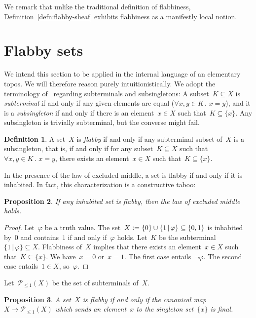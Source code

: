\documentclass[oneside]{amsart}
\theoremstyle{definition}
\newtheorem{defn}{Definition}[section]
\theoremstyle{plain}
\newtheorem{prop}[defn]{Proposition}
\theoremstyle{remark}
\renewcommand{\P}{\mathcal{P}}
\newcommand{\defeq}{\vcentcolon=}
\renewcommand{\_}{\mathpunct{.}\,}
\begin{document}
We remark that unlike the traditional definition of flabbiness,
Definition~\ref{defn:flabby-sheaf} exhibits flabbiness as a manifestly local
notion.


\section{Flabby sets}

We intend this section to be applied in the internal language of an elementary
topos. We will therefore reason purely intuitionistically. We
adopt the terminology of~\cite{kock:partial-maps} regarding subterminals and
subsingletons: A subset~$K \subseteq X$ is \emph{subterminal} if and only if any given
elements are equal ($\forall x,y \in K\_ x = y$), and it is a
\emph{subsingleton} if and only if there is an element~$x \in X$ such that~$K
\subseteq \{ x \}$. Any subsingleton is trivially subterminal, but the converse
might fail.

\begin{defn}A set~$X$ is \emph{flabby} if and only if any subterminal subset
of~$X$ is a subsingleton, that is, if and only if for any subset~$K \subseteq
X$ such that~$\forall x,y \in K\_ x = y$, there exists an element~$x \in X$
such that~$K \subseteq \{ x \}$.
\end{defn}

In the presence of the law of excluded middle, a set is flabby if and only if
it is inhabited. In fact, this characterization is a constructive taboo:

\begin{prop}If any inhabited set is flabby, then the law of excluded middle
holds.
\end{prop}

\begin{proof}Let~$\varphi$ be a truth value. The set~$X \defeq \{ 0 \}
\cup \{ 1 \,|\, \varphi \} \subseteq \{ 0,1 \}$ is inhabited by~$0$ and
contains~$1$ if and only if~$\varphi$ holds. Let~$K$ be the subterminal~$\{ 1 \,|\, \varphi
\} \subseteq X$. Flabbiness of~$X$ implies that there exists an element~$x \in
X$ such that~$K \subseteq \{x\}$. We have~$x = 0$ or~$x = 1$. The first case
entails~$\neg\varphi$. The second case entails~$1 \in X$, so~$\varphi$.
\end{proof}

Let~$\P_{\leq 1}(X)$ be the set of subterminals of~$X$.

\begin{prop}A set~$X$ is flabby if and only if the canonical map~$X \to
\P_{\leq 1}(X)$ which sends an element~$x$ to the singleton set~$\{x\}$ is
final.
\end{prop}
\end{document}
